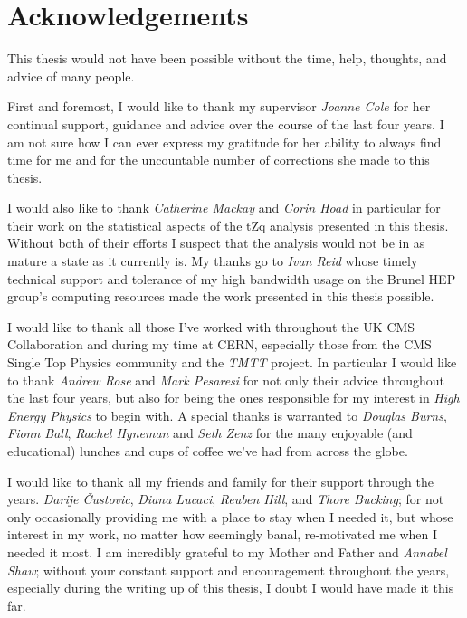 \documentclass[11pt,a4paper]{report}
\begin{document}
\clearpage
\newpage

\chapter*{Acknowledgements} \label{sec:acknowledgments}
This thesis would not have been possible without the time, help, thoughts, and advice of many people.

First and foremost, I would like to thank my supervisor \textit{Joanne Cole} for her continual support, guidance and advice over the course of the last four years.
I am not sure how I can ever express my gratitude for her ability to always find time for me and for the uncountable number of corrections she made to this thesis.

I would also like to thank \textit{Catherine Mackay} and \textit{Corin Hoad} in particular for their work on the statistical aspects of the tZq analysis presented in this thesis.
Without both of their efforts I suspect that the analysis would not be in as mature a state as it currently is.
My thanks go to \textit{Ivan Reid} whose timely technical support and tolerance of my high bandwidth usage on the Brunel HEP group's computing resources made the work presented in this thesis possible.

I would like to thank all those I've worked with throughout the UK CMS Collaboration and during my time at CERN, especially those from the CMS Single Top Physics community and the \emph{TMTT} project.
In particular I would like to thank \textit{Andrew Rose} and \textit{Mark Pesaresi} for not only their advice throughout the last four years, but also for being the ones responsible for my interest in \emph{High Energy Physics} to begin with.
A special thanks is warranted to  \textit{Douglas Burns}, \textit{Fionn Ball}, \textit{Rachel Hyneman} and \textit{Seth Zenz} for the many enjoyable (and educational) lunches and cups of coffee we've had from across the globe.

I would like to thank all my friends and family for their support through the years.
\textit{Darije \v{C}ustovi{c}}, \textit{Diana Lucaci}, \textit{Reuben Hill}, and \textit{Thore Bucking}; for not only occasionally providing me with a place to stay when I needed it, but whose interest in my work, no matter how seemingly banal, re-motivated me when I needed it most.
I am incredibly grateful to my Mother and Father and \textit{Annabel Shaw}; without your constant support and encouragement throughout the years, especially during the writing up of this thesis, I doubt I would have made it this far.
\end{document}
